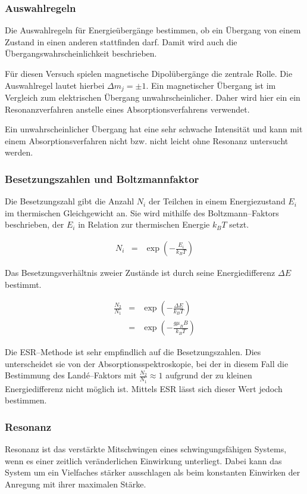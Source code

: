 \documentclass[12pt,a4paper]{scrartcl}
\numberwithin{equation}{section} %
\begin{document}
\subsubsection{Auswahlregeln}
Die Auswahlregeln für Energieübergänge bestimmen, ob ein Übergang von einem Zustand in einen anderen stattfinden darf. Damit wird auch die Übergangswahrscheinlichkeit beschrieben.

Für diesen Versuch spielen magnetische Dipolübergänge die zentrale Rolle. Die Auswahlregel lautet hierbei $\Delta m_j = \pm 1$. Ein magnetischer Übergang ist im Vergleich zum elektrischen Übergang unwahrscheinlicher. Daher wird hier ein ein Resonanzverfahren anstelle eines Absorptionsverfahrens verwendet.

Ein unwahrscheinlicher Übergang hat eine sehr schwache Intensität und kann mit einem Absorptionsverfahren nicht bzw. nicht leicht ohne Resonanz untersucht werden.

\subsubsection{Besetzungszahlen und Boltzmannfaktor}
Die Besetzungszahl gibt die Anzahl $N_i$ der Teilchen in einem Energiezustand $E_i$ im thermischen Gleichgewicht an. Sie wird mithilfe des Boltzmann--Faktors beschrieben, der $E_i$ in Relation zur thermischen Energie $k_BT$ setzt.

\begin{eqnarray}
	N_i &=& \exp(-\frac{E_i}{k_BT})
\end{eqnarray}

\noindent
Das Besetzungsverhältnis zweier Zustände ist durch seine Energiedifferenz $\Delta E$ bestimmt.

\begin{eqnarray}
	\frac{N_2}{N_1} &=& \exp(-\frac{\Delta E}{k_BT}) \\
		&=& \exp(-\frac{g\mu _B B}{k_BT})
\end{eqnarray}

\noindent
Die ESR--Methode ist sehr empfindlich auf die Besetzungszahlen. Dies unterscheidet sie von der Absorptionsspektroskopie, bei der in diesem Fall die Bestimmung des Landé--Faktors mit \(\frac{N_2}{N_1} \approx 1\) aufgrund der zu kleinen Energiedifferenz nicht möglich ist. Mittels ESR lässt sich dieser Wert jedoch bestimmen.

\hypertarget{resonanz}{\subsubsection{Resonanz}\label{resonanz}}
Resonanz ist das verstärkte Mitschwingen eines schwingungsfähigen Systems, wenn es einer zeitlich veränderlichen Einwirkung unterliegt. Dabei kann das System um ein Vielfaches stärker ausschlagen als beim konstanten Einwirken der Anregung mit ihrer maximalen Stärke.
\end{document}
